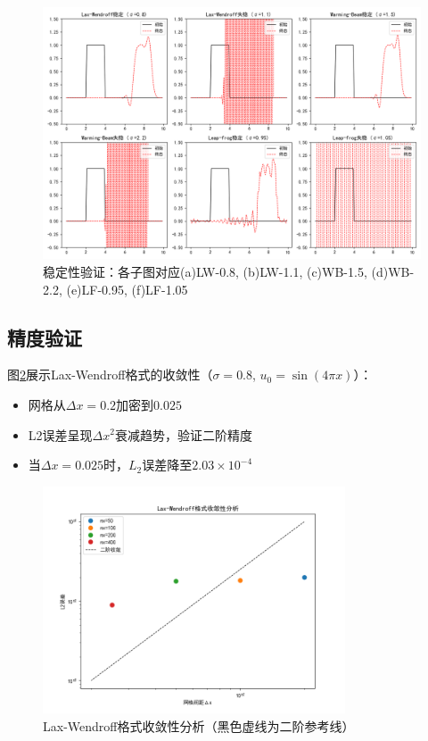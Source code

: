 \documentclass[UTF8]{ctexart}
\begin{document}
\begin{figure}[htbp]
\centering
\includegraphics[width=\textwidth]{Figure_1.png}
\caption{稳定性验证：各子图对应(a)LW-0.8, (b)LW-1.1, (c)WB-1.5, (d)WB-2.2, (e)LF-0.95, (f)LF-1.05}
\label{fig:stability}
\end{figure}

\subsection{精度验证}
图\ref{fig:convergence}展示Lax-Wendroff格式的收敛性（$\sigma=0.8$, $u_0=\sin(4\pi x)$）：

\begin{itemize}
    \item 网格从$\Delta x=0.2$加密到$0.025$
    \item L2误差呈现$\Delta x^2$衰减趋势，验证二阶精度
    \item 当$\Delta x=0.025$时，$L_2$误差降至$2.03\times10^{-4}$
\end{itemize}

\begin{figure}[htbp]
\centering
\includegraphics[width=0.8\textwidth]{Figure_2.png}
\caption{Lax-Wendroff格式收敛性分析（黑色虚线为二阶参考线）}
\label{fig:convergence}
\end{figure}
\end{document}
